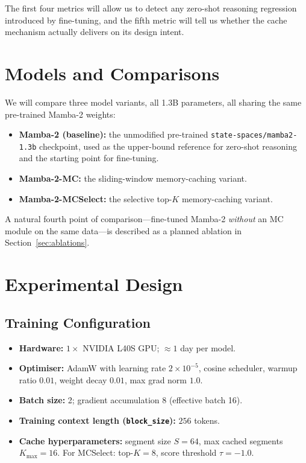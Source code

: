 \documentclass[conference]{IEEEtran}
\begin{document}
The first four metrics will allow us to detect any zero-shot reasoning regression introduced by fine-tuning, and the fifth metric will tell us whether the cache mechanism actually delivers on its design intent.

\section{Models and Comparisons}

We will compare three model variants, all 1.3B parameters, all sharing the same pre-trained Mamba-2 weights:

\begin{itemize}
    \item \textbf{Mamba-2 (baseline):} the unmodified pre-trained \texttt{state-spaces/mamba2-1.3b} checkpoint, used as the upper-bound reference for zero-shot reasoning and the starting point for fine-tuning.
    \item \textbf{Mamba-2-MC:} the sliding-window memory-caching variant.
    \item \textbf{Mamba-2-MCSelect:} the selective top-$K$ memory-caching variant.
\end{itemize}

A natural fourth point of comparison---fine-tuned Mamba-2 \emph{without} an MC module on the same data---is described as a planned ablation in Section~\ref{sec:ablations}.

\section{Experimental Design}

\subsection{Training Configuration}

\begin{itemize}
    \item \textbf{Hardware:} $1\times$ NVIDIA L40S GPU; $\approx 1$ day per model.
    \item \textbf{Optimiser:} AdamW with learning rate $2\times 10^{-5}$, cosine scheduler, warmup ratio $0.01$, weight decay $0.01$, max grad norm $1.0$.
    \item \textbf{Batch size:} 2; gradient accumulation 8 (effective batch 16).
    \item \textbf{Training context length (\texttt{block\_size}):} $256$ tokens.
    \item \textbf{Cache hyperparameters:} segment size $S=64$, max cached segments $K_{\max}=16$. For MCSelect: top-$K=8$, score threshold $\tau=-1.0$.
\end{itemize}
\end{document}
